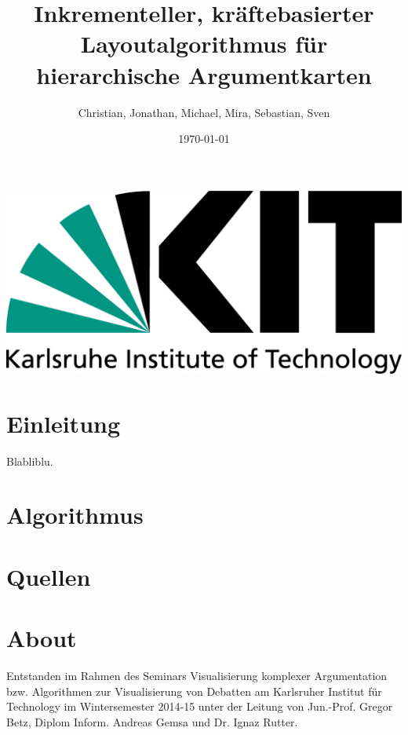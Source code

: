 \documentclass[a4paper, oneside]{scrartcl}
\author{Christian, Jonathan, Michael, Mira, Sebastian, Sven}
\date{\today}
\title{\vspace{3cm}Inkrementeller, kräftebasierter Layoutalgorithmus für hierarchische Argumentkarten}
\begin{document}
   
\nonfrenchspacing	
\maketitle

\begin{center}
\vspace{-9cm}
\includegraphics[width = 0.3\linewidth]{Pics/KITLogo.jpg}
\vspace{6.5cm}
\end{center}

\listoftodos

\section{Einleitung}
Blabliblu.

\section{Algorithmus}



\section{Quellen}


\section*{About}
Entstanden im Rahmen des Seminars Visualisierung komplexer Argumentation bzw. Algorithmen zur Visualisierung von Debatten 
am Karlsruher Institut für Technology im Wintersemester 2014-15 unter der Leitung von 
Jun.-Prof. Gregor Betz, Diplom Inform. Andreas Gemsa und Dr. Ignaz Rutter.


\end{document}
